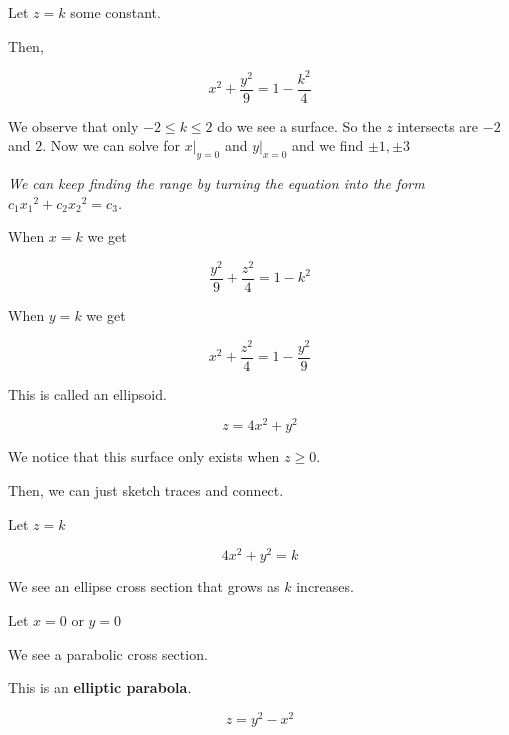 \begin{sol}
	Let $z = k$ some constant.

	Then,

	\begin{equation}
		x^2 + \frac{y^2}{9} = 1 - \frac{k^2}{4}
	\end{equation}

	We observe that only $-2 \leq k \leq 2$ do we see a surface. So the $z$ intersects are $-2$ and $2$. Now we can solve for $x|_{y=0}$ and $y|_{x=0}$ and we find $\pm 1, \pm 3$

	\textit{We can keep finding the range by turning the equation into the form $c_1{x_1}^2 + c_2{x_2}^2 = c_3$.}

	When $x = k$ we get

	\begin{equation}
		\frac{y^2}{9} + \frac{z^2}{4} = 1 - k^2
	\end{equation}

	When $y = k$ we get

	\begin{equation}
		x^2 + \frac{z^2}{4} = 1 - \frac{y^2}{9}
	\end{equation}

	This is called an ellipsoid.
\end{sol}

\begin{example}
	\begin{equation}
		z = 4x^2 + y^2
	\end{equation}
\end{example}

\begin{sol}
	We notice that this surface only exists when $z \geq 0$.

	Then, we can just sketch traces and connect.

	Let $z = k$

	\begin{equation}
		4x^2 + y^2 = k
	\end{equation}

	We see an ellipse cross section that grows as $k$ increases.

	Let $x = 0$ or $y = 0$

	We see a parabolic cross section.

	This is an \textbf{elliptic parabola}.
\end{sol}

\begin{example}
	\begin{equation}
		z = y^2 - x^2
	\end{equation}
\end{example}

